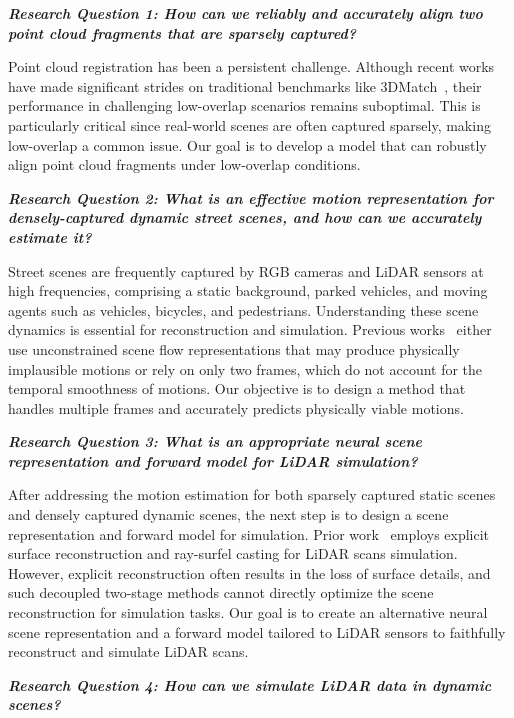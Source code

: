\noindent
\textbf{\textit{Research Question 1: How can we reliably and accurately align two point cloud fragments that are sparsely captured?}}

Point cloud registration has been a persistent challenge. Although recent works~\cite{gojcic2018learned,Choy2019FCGF} have made significant strides on traditional benchmarks like 3DMatch~\cite{zeng20163dmatch}, their performance in challenging low-overlap scenarios remains suboptimal. This is particularly critical since real-world scenes are often captured sparsely, making low-overlap a common issue. Our goal is to develop a model that can robustly align point cloud fragments under low-overlap conditions.

\noindent
\textbf{\textit{Research Question 2: What is an effective motion representation for densely-captured dynamic street scenes, and how can we accurately estimate it?}}

Street scenes are frequently captured by RGB cameras and LiDAR sensors at high frequencies, comprising a static background, parked vehicles, and moving agents such as vehicles, bicycles, and pedestrians. Understanding these scene dynamics is essential for reconstruction and simulation. Previous works~\cite{li2020neural,gojcic2021weakly} either use unconstrained scene flow representations that may produce physically implausible motions or rely on only two frames, which do not account for the temporal smoothness of motions. Our objective is to design a method that handles multiple frames and accurately predicts physically viable motions.

\noindent
\textbf{\textit{Research Question 3: What is an appropriate neural scene representation and forward model for LiDAR simulation?}}

After addressing the motion estimation for both sparsely captured static scenes and densely captured dynamic scenes, the next step is to design a scene representation and forward model for simulation. Prior work~\cite{manivasagam2020lidarsim} employs explicit surface reconstruction and ray-surfel casting for LiDAR scans simulation. However, explicit reconstruction often results in the loss of surface details, and such decoupled two-stage methods cannot directly optimize the scene reconstruction for simulation tasks. Our goal is to create an alternative neural scene representation and a forward model tailored to LiDAR sensors to faithfully reconstruct and simulate LiDAR scans.

\noindent
\textbf{\textit{Research Question 4: How can we simulate LiDAR data in dynamic scenes?}}

